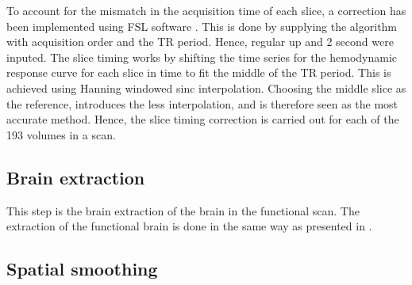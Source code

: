 To account for the mismatch in the acquisition time of each slice, a correction has been implemented using FSL software \cite{FMRIB2018}. This is done by supplying the algorithm with acquisition order and the TR period. Hence, regular up and 2 second were inputed. The slice timing works by shifting the time series for the hemodynamic response curve for each slice in time to fit the middle of the TR period. This is achieved using Hanning windowed sinc interpolation. Choosing the middle slice as the reference, introduces the less interpolation, and is therefore seen as the most accurate method. \cite{Poldrack2011} Hence, the slice timing correction is carried out for each of the 193 volumes in a scan. 

    

\subsection{Brain extraction}

This step is the brain extraction of the brain in the functional scan. The extraction of the functional brain is done in the same way as presented in . 
\subsection{Spatial smoothing}

